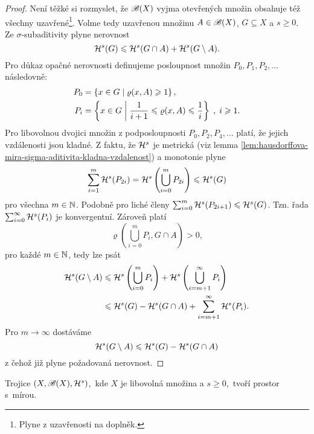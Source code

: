 \begin{proof}
    Není těžké si rozmyslet, že $\mathscr{B}(X)$ vyjma otevřených množin obsahuje též všechny uzavřené\footnote{Plyne z uzavřenosti na doplněk.}. Volme tedy uzavřenou množinu $A\in\mathscr{B}(X)$, $G\subseteq X$ a $s\geqslant 0$. Ze $\sigma$-subaditivity plyne nerovnost
    \[\mathcal{H}^{s}(G)\leqslant\mathcal{H}^{s}(G\cap A)+\mathcal{H}^{s}(G\setminus A).\]
    Pro důkaz opačné nerovnosti definujeme posloupnost množin $P_0,P_1,P_2,\ldots$ následovně:
    \begin{align*}
        P_0&=\left\{x\in G\mid\varrho(x,A)\geqslant 1\right\},\\
        P_i&=\left\{x\in G\;\middle|\;\dfrac{1}{i+1}\leqslant\varrho(x,A)\leqslant\dfrac{1}{i}\right\}\;,\;i\geqslant 1.
    \end{align*}
    Pro libovolnou dvojici množin z podposloupnosti $P_0,P_2,P_4,\ldots$ platí, že jejich vzdálenosti jsou kladné. Z faktu, že $\mathcal{H}^{s}$ je metrická (viz lemma \ref{lem:hausdorffova-mira-sigma-aditivita-kladna-vzdalenost}) a monotonie plyne
    \[\sum_{i=1}^{m}\mathcal{H}^{s}(P_{2i})=\mathcal{H}^{s}\left(\bigcup_{i=0}^m P_{2i}\right)\leqslant\mathcal{H}^{s}(G)\]
    pro všechna $m\in\mathbb{N}$. Podobně pro liché členy $\sum_{i=0}^{m}\mathcal{H}^{s}(P_{2i+1})\leqslant\mathcal{H}^{s}(G)$. Tzn. řada $\sum_{i=0}^{\infty}\mathcal{H}^{s}(P_i)$ je konvergentní. Zároveň platí
    \[\varrho\left(\bigcup_{i=0}^m P_i,G\cap A\right)>0,\]
    pro každé $m\in\mathbb{N}$, tedy lze psát
    \begin{align*}
        \mathcal{H}^{s}(G\setminus A)&\leqslant\mathcal{H}^{s}\left(\bigcup_{i=0}^m P_i\right)+\mathcal{H}^{s}\left(\bigcup_{i=m+1}^\infty P_i\right)\\
        &\leqslant\mathcal{H}^{s}(G)-\mathcal{H}^{s}(G\cap A)+\sum_{i=m+1}^{\infty}\mathcal{H}^{s}(P_i).
    \end{align*}
    Pro $m\to\infty$ dostáváme
    \[\mathcal{H}^{s}(G\setminus A)\leqslant\mathcal{H}^{s}(G)-\mathcal{H}^{s}(G\cap A)\]
    z čehož již plyne požadovaná nerovnost.
\end{proof}
\begin{corollary}\label{cor:hausdorffova-mira-je-mira}
    Trojice $(X,\mathscr{B}(X),\mathcal{H}^{s})$,~kde $X$ je libovolná množina a $s\geqslant 0$,~tvoří prostor s~mírou.
\end{corollary}

